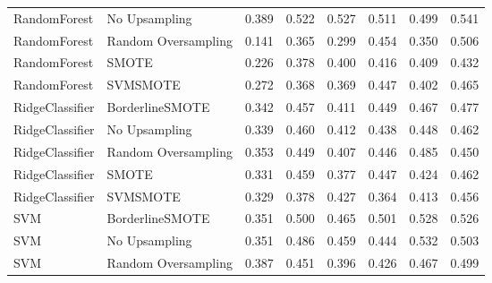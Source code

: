 \begin{tabular}{llllllll}
                RandomForest &       No Upsampling & 0.389 &                     0.522 &                 0.527 &                  0.511 &                                   0.499 &     0.541 \\
                RandomForest & Random Oversampling & 0.141 &                     0.365 &                 0.299 &                  0.454 &                                   0.350 &     0.506 \\
                RandomForest &               SMOTE & 0.226 &                     0.378 &                 0.400 &                  0.416 &                                   0.409 &     0.432 \\
                RandomForest &            SVMSMOTE & 0.272 &                     0.368 &                 0.369 &                  0.447 &                                   0.402 &     0.465 \\
             RidgeClassifier &     BorderlineSMOTE & 0.342 &                     0.457 &                 0.411 &                  0.449 &                                   0.467 &     0.477 \\
             RidgeClassifier &       No Upsampling & 0.339 &                     0.460 &                 0.412 &                  0.438 &                                   0.448 &     0.462 \\
             RidgeClassifier & Random Oversampling & 0.353 &                     0.449 &                 0.407 &                  0.446 &                                   0.485 &     0.450 \\
             RidgeClassifier &               SMOTE & 0.331 &                     0.459 &                 0.377 &                  0.447 &                                   0.424 &     0.462 \\
             RidgeClassifier &            SVMSMOTE & 0.329 &                     0.378 &                 0.427 &                  0.364 &                                   0.413 &     0.456 \\
                         SVM &     BorderlineSMOTE & 0.351 &                     0.500 &                 0.465 &                  0.501 &                                   0.528 &     0.526 \\
                         SVM &       No Upsampling & 0.351 &                     0.486 &                 0.459 &                  0.444 &                                   0.532 &     0.503 \\
                         SVM & Random Oversampling & 0.387 &                     0.451 &                 0.396 &                  0.426 &                                   0.467 &     0.499 \\

\end{tabular}
